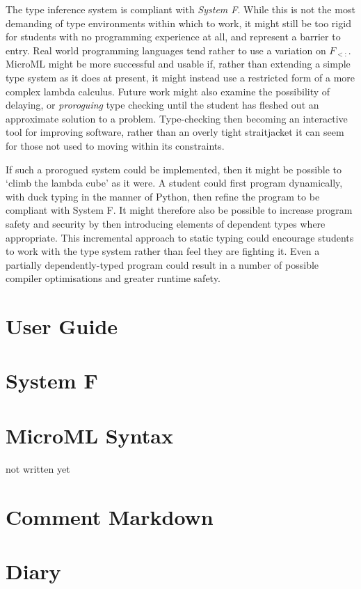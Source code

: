 \documentclass[12pt, a4paper]{report}
\begin{document}
The type inference system is compliant with \textit{System F}. While this is not the most demanding
of type environments within which to work, it might still be too rigid for students with no
programming experience at all, and represent a barrier to entry. Real world programming languages
tend rather to use a variation on $F_{<:}$. MicroML might be more successful and usable if, rather
than extending a simple type system as it does at present, it might instead use a restricted form
of a more complex lambda calculus. Future work might also examine the possibility of delaying, or
\textit{proroguing} type checking until the student has fleshed out an approximate solution to a
problem\cite{Afshari:2012:LPP:2384592.2384595}. Type-checking then becoming an interactive tool
for improving software, rather than an overly tight straitjacket it can seem for those not used to
moving within its constraints.

If such a prorogued system could be implemented, then it might be possible to `climb the lambda
cube' as it were. A student could first program dynamically, with duck typing in the manner of
Python, then refine the program to be compliant with System F. It might therefore also be possible
to increase program safety and security by then introducing elements of dependent types where
appropriate. This incremental approach to static typing could encourage students to work with the
type system rather than feel they are fighting it. Even a partially dependently-typed program could
result in a number of possible compiler optimisations and greater runtime safety.

\begin{appendices}
    \chapter{User Guide}
    
    \chapter{System F}
    \label{appendix:sysf}
    
    \chapter{MicroML Syntax}
    \label{appendix:syntax}
    not written yet
    \chapter{Comment Markdown}
    \label{appendix:md}
    
    \chapter{Diary}
    \label{appendix:diary}
    
\end{appendices}

\nocite{adams2012layout}
\nocite{9780511608865}
\nocite{Wadler:1995:MFP:647698.734146}

{}

\end{document}
